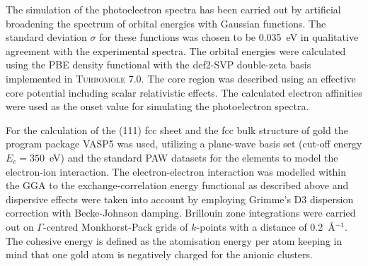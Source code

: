 The simulation of the photoelectron spectra has been carried out by artificial
broadening the spectrum of orbital energies with Gaussian functions. The
standard deviation $\sigma$ for these functions was chosen to be 0.035~eV in
qualitative agreement with the experimental spectra. The orbital energies were
calculated using the PBE density functional with the
def2-SVP\autocite{Weigend_Balancedbasissets_2005} double-zeta basis implemented
in \textsc{Turbomole} 7.0.\autocite{_TURBOMOLEV72015_} The core region was
described using an effective core potential including scalar relativistic
effects.  The calculated electron affinities were used as the onset value for
simulating the photoelectron spectra. 


For the calculation of the (111) fcc sheet and the fcc bulk structure of gold
the program package VASP5\autocite{Kresse_Efficiencyabinitiototal_1996} was
used, utilizing a plane-wave basis set (cut-off energy $E_c=350$~eV) and the
standard \ac{PAW} datasets for the elements to model the electron-ion
interaction\autocite{Blochl_Projectoraugmentedwavemethod_1994,Kresse_ultrasoftpseudopotentialsprojector_1999}.
The electron-electron interaction was modelled within the \ac{GGA} to the
exchange-correlation energy functional as described above and dispersive effects
were taken into account by employing Grimme's D3 dispersion correction with
Becke-Johnson
damping.\autocite{Grimme_consistentaccurateinitio_2010,Grimme_Effectdampingfunction_2011}
Brillouin zone integrations were carried out on $\Gamma$-centred Monkhorst-Pack
grids of $k$-points with a distance of 0.2~\AA$^{-1}$. The cohesive energy is
defined as the atomisation energy per atom keeping in mind that one gold atom is
negatively charged for the anionic clusters.

